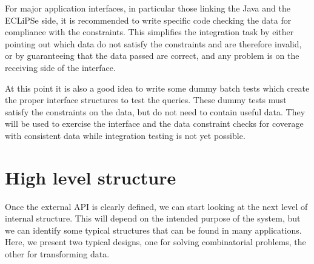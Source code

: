 \documentclass[a4paper,12pt]{report}
\begin{document}
For major application interfaces, in particular those linking the Java and the ECLiPSe side, it is recommended to write specific code checking the data for compliance with the constraints. This simplifies the integration task by either pointing out which data do not satisfy the constraints and are therefore invalid, or by guaranteeing that the data passed are correct, and any problem is on the receiving side of the interface.

At this point it is also a good idea to write some dummy batch tests which create the proper interface structures to test the queries. These dummy tests must satisfy the constraints on the data, but do not need to contain useful data. They will be used to exercise the interface and the data constraint checks for coverage with consistent data while integration testing is not yet possible.
 
\section{High level structure}
Once the external API is clearly defined, we can start looking at the next level of internal structure. This will depend on the intended purpose of the system, but we can identify some typical structures that can be found in many applications. Here, we present two typical designs, one for solving combinatorial problems, the other for transforming data.
\end{document}

